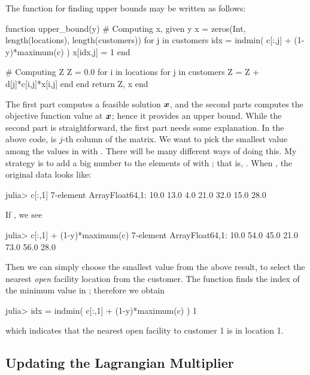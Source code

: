 The \julia function for finding upper bounds may be written as follows:
\begin{code}
function upper_bound(y)
    # Computing x, given y
    x = zeros(Int, length(locations), length(customers))
    for j in customers
        idx = indmin( c[:,j] + (1-y)*maximum(c) )
        x[idx,j] = 1
    end

    # Computing Z
    Z = 0.0
    for i in locations
        for j in customers
            Z = Z + d[j]*c[i,j]*x[i,j]
        end
    end
    return Z, x
end
\end{code}
\noindent The first part computes a feasible solution $\boldsymbol{x}$, and the second parts computes the objective function value at $\boldsymbol{x}$; hence it provides an upper bound. While the second part is straightforward, the first part needs some explanation. In the above code,  is $j$-th column of the  matrix. We want to pick the smallest value among the values in  with . There will be many different ways of doing this. My strategy is to add a big number to the elements of  with ; that is, . When , the original data  looks like:
\begin{code}
julia> c[:,1]
7-element Array{Float64,1}:
 10.0
 13.0
  4.0
 21.0
 32.0
 15.0
 28.0
\end{code}
\noindent If , we see
\begin{code}
julia> c[:,1] + (1-y)*maximum(c)
7-element Array{Float64,1}:
 10.0
 54.0
 45.0
 21.0
 73.0
 56.0
 28.0
\end{code}
\noindent Then we can simply choose the smallest value from the above result, to select the nearest \emph{open} facility location from the customer. The function  finds the index of the minimum value in ; therefore we obtain
\begin{code}
julia> idx = indmin( c[:,1] + (1-y)*maximum(c) )
1
\end{code}
\noindent which indicates that the nearest open facility to customer 1 is in location 1.





\subsection{Updating the Lagrangian Multiplier}

